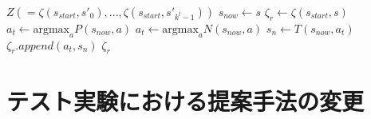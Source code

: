\begin{algorithm}
\begin{algorithmic}[1]
                \EndFor     
           \EndWhile
           \Return $Z(={\zeta(s_{start}, {s'}_0), ..., \zeta(s_{start}, {s'}_{k^l-1})})$
        \EndFunction
        \State $s_{now} \gets s$
        \State $\zeta_r \gets \zeta(s_{start}, s)$
                \State \underline{$a_t \gets \textrm{argmax}_a P(s_{now}, a)$}
            \Else
                \State $a_t \gets \textrm{argmax}_a N(s_{now}, a)$
            \EndIf
            \State $s_n \gets T(s_{now}, a_t)$
            \State $\zeta_r.append({a_t, s_n})$
        \EndWhile
        \Return $\zeta_r$
        \EndFunction
       
        
    \end{algorithmic}
\end{algorithm}
\section{テスト実験における提案手法の変更}